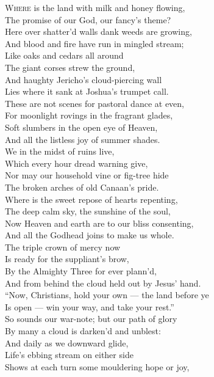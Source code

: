 \textsc{Where} is the land with milk and honey flowing, \\
 The promise of our God, our fancy’s theme? \\
 Here over shatter’d walls dank weeds are growing, \\
 And blood and fire have run in mingled stream; \\
 Like oaks and cedars all around \\
 The giant corses strew the ground, \\
 And haughty Jericho’s cloud-piercing wall \\
 Lies where it sank at Joshua’s trumpet call. \\
  These are not scenes for pastoral dance at even, \\
 For moonlight rovings in the fragrant glades, \\
 Soft slumbers in the open eye of Heaven, \\
 And all the listless joy of summer shades. \\
 We in the midst of ruins live, \\
 Which every hour dread warning give, \\
 Nor may our household vine or fig-tree hide \\
 The broken arches of old Canaan’s pride. \\
  Where is the sweet repose of hearts repenting, \\
 The deep calm sky, the sunshine of the soul, \\
 Now Heaven and earth are to our bliss consenting, \\
 And all the Godhead joins to make us whole. \\
 The triple crown of mercy now \\
 Is ready for the suppliant’s brow, \\
 By the Almighty Three for ever plann’d, \\
 And from behind the cloud held out by Jesus’ hand. \\
  “Now, Christians, hold your own — the land before ye \\
 Is open — win your way, and take your rest.” \\
 So sounds our war-note; but our path of glory \\
 By many a cloud is darken’d and unblest: \\
 And daily as we downward glide, \\
 Life’s ebbing stream on either side \\
 Shows at each turn some mouldering hope or joy, \\
